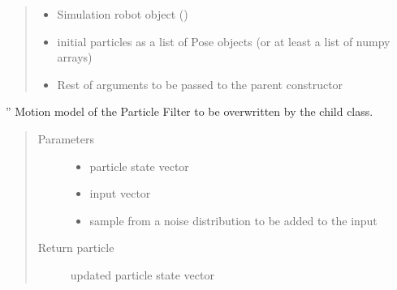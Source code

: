 \documentclass[letterpaper,10pt,english]{sphinxmanual}
\begin{document}
\begin{fulllineitems}
\begin{fulllineitems}
\begin{quote}
\begin{description}
\begin{itemize}
\item {} 
\sphinxAtStartPar
{} \textendash{} Simulation robot object ()

\item {} 
\sphinxAtStartPar
{} \textendash{} initial particles as a list of Pose objects (or at least a list of numpy arrays)

\item {} 
\sphinxAtStartPar
{} \textendash{} Rest of arguments to be passed to the parent constructor

\end{itemize}

\end{description}\end{quote}

\end{fulllineitems}


\begin{fulllineitems}
\label{\detokenize{particle_filter:ParticleFilter.ParticleFilter.MotionModel}}
\sphinxAtStartPar
”
Motion model of the Particle Filter to be overwritten by the child class.
\begin{quote}\begin{description}
\item[{Parameters}] \leavevmode\begin{itemize}
\item {} 
\sphinxAtStartPar
{} \textendash{} particle state vector

\item {} 
\sphinxAtStartPar
{} \textendash{} input vector

\item {} 
\sphinxAtStartPar
{} \textendash{} sample from a noise distribution to be added to the input

\end{itemize}

\item[{Return particle}] \leavevmode
\sphinxAtStartPar
updated particle state vector


\end{description}
\end{quote}
\end{fulllineitems}
\end{fulllineitems}
\end{document}

